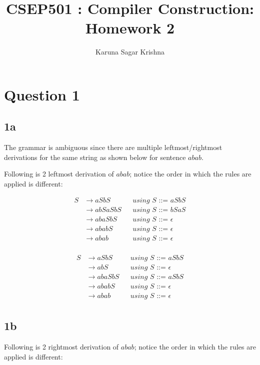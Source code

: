 \documentclass{article}
\title{CSEP501 : Compiler Construction: Homework 2}
\author{Karuna Sagar Krishna}
\begin{document}
    \maketitle

    \section*{Question 1}

    \subsection*{1a}
    The grammar is ambiguous since there are multiple leftmost/rightmost derivations for the same string as shown below for sentence $abab$.

    Following is 2 leftmost derivation of $abab$; notice the order in which the rules are applied is different:

    \begin{align*}
        S   & \rightarrow aSbS      && \textit{using S ::= aSbS} \\
            & \rightarrow abSaSbS   && \textit{using S ::= bSaS} \\
            & \rightarrow abaSbS    && \textit{using S ::= $\epsilon$} \\
            & \rightarrow ababS     && \textit{using S ::= $\epsilon$} \\
            & \rightarrow abab      && \textit{using S ::= $\epsilon$} \\
    \end{align*}

    \begin{align*}
        S   & \rightarrow aSbS      && \textit{using S ::= aSbS} \\
            & \rightarrow abS       && \textit{using S ::= $\epsilon$} \\
            & \rightarrow abaSbS    && \textit{using S ::= aSbS} \\
            & \rightarrow ababS     && \textit{using S ::= $\epsilon$} \\
            & \rightarrow abab      && \textit{using S ::= $\epsilon$} \\
    \end{align*}

    \subsection*{1b}
    Following is 2 rightmost derivation of $abab$; notice the order in which the rules are applied is different:
\end{document}

